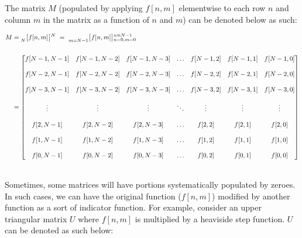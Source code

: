 \documentclass{article}
\begin{document}
The matrix $M$ (populated by applying $f[n, m]$ elementwise to each row $n$ and column $m$ in the matrix as a function of $n$ and $m$) can be denoted below as such:

\begin{align*}
    M&=   \prescript{}{N}{\begin{bmatrix} f[n, m] \end{bmatrix}}^{N} \ 
      = \ \prescript{}{m = N - 1}{\begin{bmatrix} f[n, m] \end{bmatrix}}^{n = N - 1}_{n = 0,m =0} \\ \\
     &= \begin{bmatrix}
            f[N - 1, N - 1] & f[N - 1, N - 2] & f[N - 1, N - 3] & \ldots & f[N - 1, 2] & f[N - 1, 1] & f[N - 1, 0] \\ \\
            f[N - 2, N - 1] & f[N - 2, N - 2] & f[N - 2, N - 3] & \ldots & f[N - 2, 2] & f[N - 2, 1] & f[N - 2, 0] \\ \\
            f[N - 3, N - 1] & f[N - 3, N - 2] & f[N - 3, N - 3] & \ldots & f[N - 3, 2] & f[N - 3, 1] & f[N - 3, 0] \\ \\
                     \vdots &          \vdots &          \vdots & \ddots &      \vdots &      \vdots &      \vdots \\ \\
            f[    2, N - 1] & f[    2, N - 2] & f[    2, N - 3] & \ldots & f[    2, 2] & f[    2, 1] & f[    2, 0] \\ \\
            f[    1, N - 1] & f[    1, N - 2] & f[    1, N - 3] & \ldots & f[    1, 2] & f[    1, 1] & f[    1, 0] \\ \\
            f[    0, N - 1] & f[    0, N - 2] & f[    0, N - 3] & \ldots & f[    0, 2] & f[    0, 1] & f[    0, 0]
          \end{bmatrix} \\ \\
  \end{align*} 

\newpage

Sometimes, some matrices will have portions systematically populated by zeroes. In such cases, we can have the original function ($f[n, m]$) modified by another function as a sort of indicator function. For example, consider an upper triangular matrix $U$ where $f[n, m]$ is multiplied by a heaviside step function. $U$ can be denoted as such below:
\end{document}
